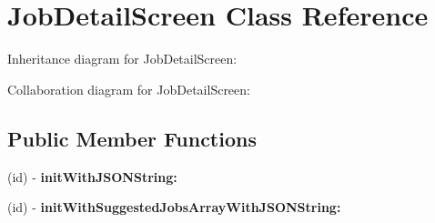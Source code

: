 \hypertarget{interface_job_detail_screen}{
\section{\-Job\-Detail\-Screen \-Class \-Reference}
\label{interface_job_detail_screen}
}


\-Inheritance diagram for \-Job\-Detail\-Screen\-:


\-Collaboration diagram for \-Job\-Detail\-Screen\-:
\subsection*{\-Public \-Member \-Functions}
\begin{DoxyCompactItemize}
\item 
\hypertarget{interface_job_detail_screen_a0b161db9e39d0e75551241497e408d7b}{
(id) -\/ {\bfseries init\-With\-J\-S\-O\-N\-String\-:}}
\label{interface_job_detail_screen_a0b161db9e39d0e75551241497e408d7b}

\item 
\hypertarget{interface_job_detail_screen_ac49a62eabbac23ddf86878a041e9cece}{
(id) -\/ {\bfseries init\-With\-Suggested\-Jobs\-Array\-With\-J\-S\-O\-N\-String\-:}}
\label{interface_job_detail_screen_ac49a62eabbac23ddf86878a041e9cece}

\end{DoxyCompactItemize}
